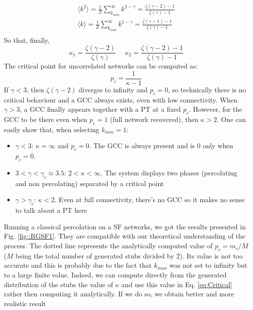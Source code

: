 \begin{equation}
\begin{aligned}
	\langle k^2 \rangle = \frac{1}{Z} \sum_{k_{min}}^{\infty} k^{2-\gamma} = \frac{\zeta(\gamma-2)-1}{\zeta(\gamma)-1}  \\
	\langle k \rangle = \frac{1}{Z} \sum_{k_{min}}^{\infty} k^{1-\gamma} = \frac{\zeta(\gamma-1)-1}{\zeta(\gamma)-1}  \\
\end{aligned}
\end{equation}
So that, finally,
\begin{equation}
	\kappa_1 = \frac{\zeta(\gamma-2)}{\zeta(\gamma)} \>\>\>\>\>\>  \kappa_2 = \frac{\zeta(\gamma-2)-1}{\zeta(\gamma)-1}
\end{equation}
The critical point for uncorrelated networks can be computed as:
\begin{equation}
	\label{eq:Critical}
	p_c = \frac{1}{\kappa - 1}
\end{equation}
If $\gamma < 3$, then $\zeta(\gamma-2)$ diverges to infinity and $p_c = 0$, so technically there is no critical behaviour and a GCC always exists, even with low connectivity. When $\gamma > 3$, a GCC finally appears together with a PT at a fixed $p_c$. However, for the GCC to be there even when $p_c = 1$ (full network recovered), then $\kappa > 2$. One can easily show that, when selecting $k_{min} = 1$:
\begin{itemize}
		\item $\gamma < 3$: $\kappa = \infty$ and $p_c = 0$. The GCC is always present and is $0$ only when $p_c = 0$.
		\item $3 < \gamma < \gamma_c \approx 3.5$: $2 < \kappa < \infty $. The system displays two phases (percolating and non percolating) separated by a critical point
		\item $\gamma > \gamma_c$: $\kappa < 2$. Even at full connectivity, there's no GCC so it makes no sense to talk about a PT here
\end{itemize}

Running a classical percolation on a SF networks, we got the results presented in Fig. \ref{fig::RGSF1}. They are compatible with our theoretical understanding of the process. The dotted line represents the analytically computed value of $p_c = m_c / M$ ($M$ being the total number of generated stubs divided by $2$). Its value is not too accurate and this is probably due to the fact that $k_{max}$ was not set to infinity but to a large finite value. Indeed, we can compute directly from the generated distribution of the stubs the value of $\kappa$ and use this value in Eq. \ref{eq:Critical} rather then computing it analytically. If we do so, we obtain better and more realistic result

